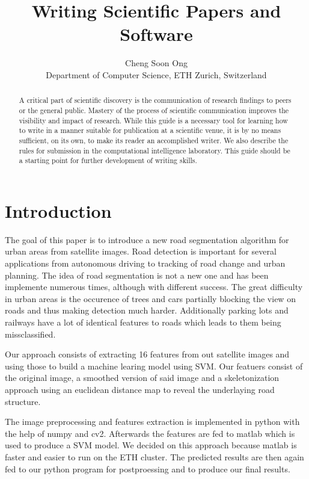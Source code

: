 \documentclass[10pt,conference,compsocconf]{IEEEtran}
\begin{document}
\title{Writing Scientific Papers and Software}

\author{
  Cheng Soon Ong\\
  Department of Computer Science, ETH Zurich, Switzerland
}

\maketitle

\begin{abstract}
  A critical part of scientific discovery is the
  communication of research findings to peers or the general public.
  Mastery of the process of scientific communication improves the
  visibility and impact of research. While this guide is a necessary
  tool for learning how to write in a manner suitable for publication
  at a scientific venue, it is by no means sufficient, on its own, to
  make its reader an accomplished writer. We also describe the rules
  for submission in the computational intelligence laboratory.
  This guide should be a
  starting point for further development of writing skills.
\end{abstract}

\section{Introduction}

The goal of this paper is to introduce a new road segmentation algorithm for urban areas from satellite images.
Road detection is important for several applications from autonomous driving to tracking
of road change and urban planning.
The idea of road segmentation is not a new one and has been implemente numerous times, although with
different success. The great difficulty in urban areas is the occurence of trees and cars partially blocking the
view on roads and thus making detection much harder. Additionally parking lots and railways have a lot of
identical features to roads which leads to them being missclassified.

Our approach consists of extracting 16 features from out satellite images and using those to build a machine
learing model using SVM. Our featuers consist of the original image, a smoothed version of said image and a 
skeletonization approach using an euclidean distance map to reveal the underlaying road structure.

The image preprocessing and features extraction is implemented in python with the help of numpy and cv2.
Afterwards the features are fed to matlab which is used to produce a SVM model. We decided on this 
approach because matlab is faster and easier to run on the ETH cluster. The predicted results are then
again fed to our python program for postproessing and to produce our final results.
\end{document}
